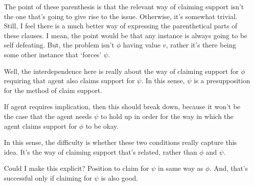 \begin{note}
  {
    \color{red}
    The point of these parenthesis is that the relevant way of claiming support isn't the one that's going to give rise to the issue.
    Otherwise, it's somewhat trivial.
    Still, I feel there is a much better way of expressing the parenthetical parts of these clauses.
    I mean, the point would be that any instance is always going to be self defeating.
    But, the problem isn't \(\phi\) having value \(v\), rather it's there being some other instance that `forces' \(\psi\).
  }
  {
    \color{blue}
    Well, the interdependence here is really about the way of claiming support for \(\phi\) requiring that agent also claims support for \(\psi\).
    In this sense, \(\psi\) is a presupposition for the method of claim support.

    If agent requires implication, then this should break down, because it won't be the case that the agent needs \(\psi\) to hold up in order for the way in which the agent claims support for \(\phi\) to be okay.

    In this sense, the difficulty is whether these two conditions really capture this idea.
    It's the way of claiming support that's related, rather than \(\phi\) and \(\psi\).

    Could I make this explicit?
    Position to claim for \(\psi\) in same way as \(\phi\).
    And, that's successful only if claiming for \(\psi\) is also good.
  }
\end{note}

